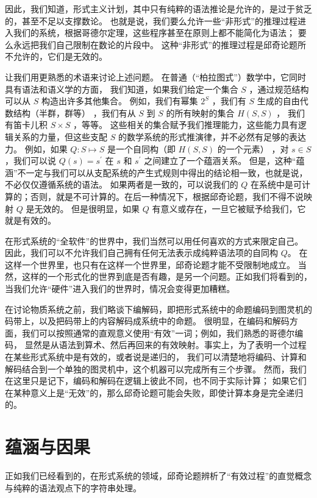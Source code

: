 \documentclass[a4paper,12pt]{article}
\begin{document}
因此，我们知道，形式主义计划，其中只有纯粹的语法推论是允许的，是过于贫乏的，甚至不足以支撑数论。
也就是说，我们要么允许一些“非形式”的推理过程进入我们的系统，根据哥德尔定理，这些程序甚至在原则上都不能简化为语法； 要么永远把我们自己限制在数论的片段中。
这种“非形式”的推理过程是邱奇论题所不允许的，它们是无效的。

让我们用更熟悉的术语来讨论上述问题。 在普通（“柏拉图式”）数学中，它同时具有语法和语义学的方面，
我们知道，如果我们给定一个集合 $S$ ，通过规范结构可以从 $S$ 构造出许多其他集合。
例如，我们有幂集 $2^S$ ，我们有 $S$ 生成的自由代数结构（半群，群等） ，我们有从 $S$ 到 $S$ 的所有映射的集合 $H(S, S)$ ，
我们有笛卡儿积 $S \times S$ ，等等。
这些相关的集合赋予我们推理能力，这些能力具有逻辑关系的力量，但这些支配 $S$ 的数学系统的形式推演律，并不必然有足够的表达力。
例如，如果 $Q: S \mapsto S$ 是一个自同构（即 $H(S, S)$ 的一个元素） ，对 $s \in S $，我们可以说 $Q(s) = s^{\prime}$ 在 $s$ 和 $s^{\prime}$ 之间建立了一个蕴涵关系。
但是，这种“蕴涵”不一定与我们可以从支配系统的产生式规则中得出的结论相一致，也就是说，不必仅仅遵循系统的语法。
如果两者是一致的，可以说我们的 $Q$ 在系统中是可计算的；否则，就是不可计算的。在后一种情况下，根据邱奇论题，我们不得不说映射 $Q$ 是无效的。
但是很明显，如果 $Q$ 有意义或存在，一旦它被赋予给我们，它就是有效的。

在形式系统的“全软件”的世界中，我们当然可以用任何喜欢的方式来限定自己。
因此，我们可以不允许我们自己拥有任何无法表示成纯粹语法项的自同构 $Q$。
在这样一个世界里，也只有在这样一个世界里，邱奇论题才能不受限制地成立。
当然，这样的一个形式化的世界到底是否有趣，是另一个问题。正如我们将看到的，当我们允许“硬件”进入我们的世界时，情况会变得更加糟糕。

在讨论物质系统之前，我们略谈下编解码，即把形式系统中的命题编码到图灵机的码带上，以及把码带上的内容解码成系统中的命题。
很明显，在编码和解码方面，我们可以按照通常的直观意义使用“有效”一词；例如，我们熟悉的哥德尔编码，
显然是从语法到算术、然后再回来的有效映射。事实上，为了表明一个过程在某些形式系统中是有效的，或者说是递归的，
我们可以清楚地将编码、计算和解码结合到一个单独的图灵机中，这个机器可以完成所有三个步骤。
然而，我们在这里只是记下，编码和解码在逻辑上彼此不同，也不同于实际计算；
如果它们在某种意义上是“无效”的，那么邱奇论题可能会失败，即使计算本身是完全递归的。

\section{蕴涵与因果}

正如我们已经看到的，在形式系统的领域，邱奇论题辨析了“有效过程”的直觉概念与纯粹的语法观点下的字符串处理。
\end{document}
